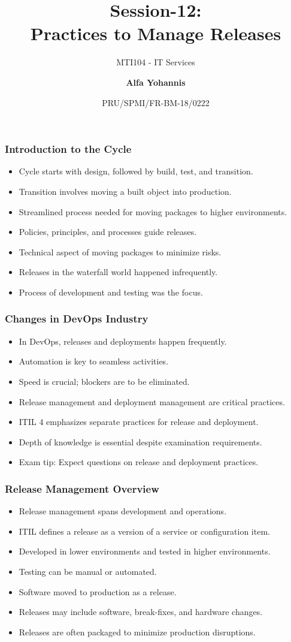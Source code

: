 \documentclass[aspectratio=169, table]{beamer}
\subtitle{MTI104 - IT Services}
\title{Session-12:\\\LARGE{Practices to Manage Releases\\}}
\date[Serial]{\scriptsize {PRU/SPMI/FR-BM-18/0222}}
\author[Pradita]{\small{\textbf{Alfa Yohannis}}}
\begin{document}
\frame{\titlepage}

\begin{frame}
	\frametitle{Introduction to the Cycle}
	\begin{itemize}
		\item Cycle starts with design, followed by build, test, and transition.
		\item Transition involves moving a built object into production.
		\item Streamlined process needed for moving packages to higher environments.
		\item Policies, principles, and processes guide releases.
		\item Technical aspect of moving packages to minimize risks.
		\item Releases in the waterfall world happened infrequently.
		\item Process of development and testing was the focus.
	\end{itemize}
\end{frame}

\begin{frame}
	\frametitle{Changes in DevOps Industry}
	\begin{itemize}
		\item In DevOps, releases and deployments happen frequently.
		\item Automation is key to seamless activities.
		\item Speed is crucial; blockers are to be eliminated.
		\item Release management and deployment management are critical practices.
		\item ITIL 4 emphasizes separate practices for release and deployment.
		\item Depth of knowledge is essential despite examination requirements.
		\item Exam tip: Expect questions on release and deployment practices.
	\end{itemize}
\end{frame}

\begin{frame}
	\frametitle{Release Management Overview}
	\begin{itemize}
		\item Release management spans development and operations.
		\item ITIL defines a release as a version of a service or configuration item.
		\item Developed in lower environments and tested in higher environments.
		\item Testing can be manual or automated.
		\item Software moved to production as a release.
		\item Releases may include software, break-fixes, and hardware changes.
		\item Releases are often packaged to minimize production disruptions.
	\end{itemize}
\end{frame}
\end{document}
